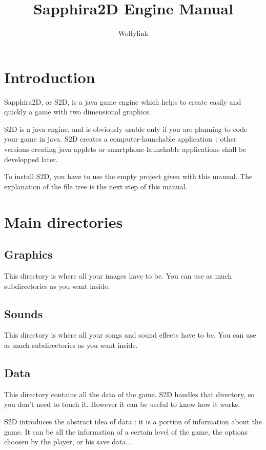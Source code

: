 \documentclass[a4paper,11pt]{report}
\title{Sapphira2D Engine Manual}
\author{Wolfylink}
\begin{document}
	\maketitle
	\tableofcontents
	
	\chapter{Introduction}
		
		Sapphira2D, or S2D, is a java game engine which helps to create easily and quickly a game with two dimensional graphics.
	
		S2D is a java engine, and is obviously usable only if you are planning to code your game in java.
		S2D creates a computer-launchable application~;
		other versions creating java applets or smartphone-launchable applications shall be developped later.
	
		To install S2D, you have to use the empty project given with this manual.
		The explanation of the file tree is the next step of this manual.
		
	\chapter{Main directories}
	
		\section{Graphics}
			This directory is where all your images have to be. You can use as much subdirectories as you want inside.
		\section{Sounds}
			This directory is where all your songs and sound effects have to be. You can use as much subdirectories as you want inside.
		\section{Data}
			This directory contains all the data of the game. S2D handles that directory, so you don't need to touch it.
			However it can be useful to know how it works.
	
			S2D introduces the abstract idea of data : it is a portion of information about the game.
			It can be all the information of a certain level of the game, the options choosen by the player, or his save data...
	
\end{document}
